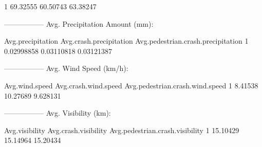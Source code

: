 \documentclass[11pt, a4paper]{article}
\begin{document}
\begin{Schunk}
\begin{Soutput}
1     69.32555           60.50743                      63.38247
\end{Soutput}
\begin{Soutput}
-----------------
Avg. Precipitation Amount (mm):
\end{Soutput}
\begin{Soutput}
  Avg.precipitation Avg.crash.precipitation Avg.pedestrian.crash.precipitation
1        0.02998858              0.03110818                         0.03121387
\end{Soutput}
\begin{Soutput}
-----------------
Avg. Wind Speed (km/h):
\end{Soutput}
\begin{Soutput}
  Avg.wind.speed Avg.crash.wind.speed Avg.pedestrian.crash.wind.speed
1        8.41538             10.27689                        9.628131
\end{Soutput}
\begin{Soutput}
-----------------
Avg. Visibility (km):
\end{Soutput}
\begin{Soutput}
  Avg.visibility Avg.crash.visibility Avg.pedestrian.crash.visibility
1       15.10429             15.14964                        15.20434
\end{Soutput}
\end{Schunk}









\pagebreak
\section{}
\end{document}
